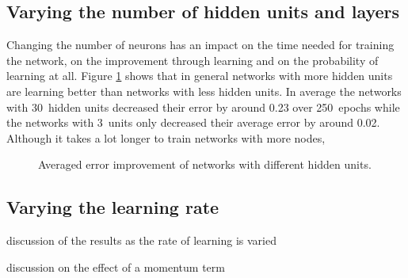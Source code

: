 \documentclass[12pt, a4paper]{article}
\begin{document}
\subsection*{Varying the number of hidden units and layers}

Changing the number of neurons has an impact on the time needed for training the network, on the improvement through learning and on the probability of learning at all. Figure \ref{fig:average-vary-units} shows that in general networks with more hidden units are learning better than networks with less hidden units. In average the networks with 30~hidden units decreased their error by around 0.23 over 250~epochs while the networks with 3~units only decreased their average error by around 0.02. Although it takes a lot longer to train networks with more nodes,
\begin{figure}[htbp]
	\caption{Averaged error improvement of networks with different hidden units.}
	\label{fig:average-vary-units}
\end{figure}



\subsection*{Varying the learning rate}

discussion of the results as the rate of learning is varied

discussion on the effect of a momentum term
\end{document}
